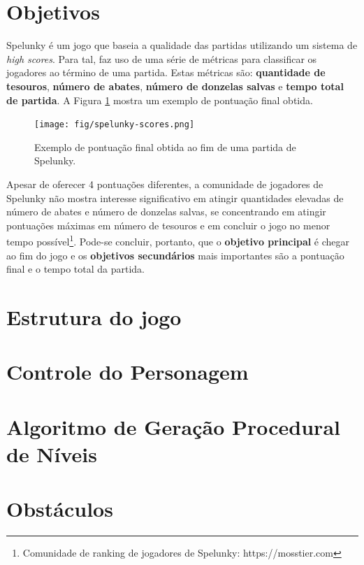 \section{\label{section:spelunky-goals}Objetivos}
Spelunky é um jogo que baseia a qualidade das partidas utilizando um sistema de
\textit{high scores}. Para tal, faz uso de uma série de métricas para
classificar os jogadores ao término de uma partida. Estas métricas são:
\textbf{quantidade de tesouros}, \textbf{número de abates}, \textbf{número de
donzelas salvas} e \textbf{tempo total de partida}. A Figura
\ref{fig:spelunky-scores} mostra um exemplo de pontuação final obtida.

\begin{figure}[htb!]
\centering
\texttt{[image: fig/spelunky-scores.png]}
\caption{\label{fig:spelunky-scores}Exemplo de pontuação final obtida ao fim de
uma partida de Spelunky.}
\end{figure}

Apesar de oferecer 4 pontuações diferentes, a comunidade de jogadores de
Spelunky não mostra interesse significativo em atingir quantidades elevadas de
número de abates e número de donzelas salvas, se concentrando em atingir
pontuações máximas em número de tesouros e em concluir o jogo no menor tempo
possível\footnote{Comunidade de ranking de jogadores de Spelunky:
https://mosstier.com}. Pode-se concluir, portanto, que o \textbf{objetivo
principal} é chegar ao fim do jogo e os \textbf{objetivos secundários} mais
importantes são a pontuação final e o tempo total da partida.

\section{\label{section:spelunky-structure}Estrutura do jogo}

\section{\label{section:spelunky-controls}Controle do Personagem}

\section{\label{section:spelunky-procgen}Algoritmo de Geração Procedural de
Níveis}

\section{\label{section:spelunky-obstacles}Obstáculos}

